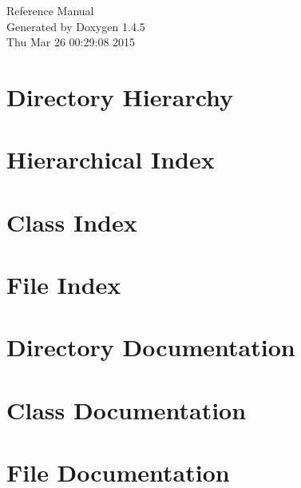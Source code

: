 \documentclass[a4paper]{book}
\begin{document}
\begin{titlepage}
\vspace*{7cm}
\begin{center}
{\Large Reference Manual}\\
\vspace*{1cm}
{\large Generated by Doxygen 1.4.5}\\
\vspace*{0.5cm}
{\small Thu Mar 26 00:29:08 2015}\\
\end{center}
\end{titlepage}
\clearemptydoublepage
{}
\tableofcontents
\clearemptydoublepage
{}
\chapter{Directory Hierarchy}

\chapter{Hierarchical Index}

\chapter{Class Index}

\chapter{File Index}

\chapter{Directory Documentation}





\chapter{Class Documentation}






\chapter{File Documentation}











\printindex
\end{document}
